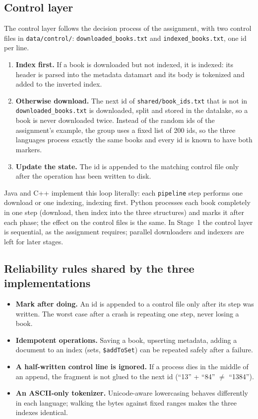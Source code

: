 \documentclass[11pt,a4paper]{article}
\newcommand{\code}[1]{\texttt{#1}}
\begin{document}
\subsection{Control layer}\label{sec:control}
The control layer follows the decision process of the assignment, with two control files in
\code{data/control/}: \code{downloaded\_books.txt} and \code{indexed\_books.txt}, one id per line.
\begin{enumerate}
  \item \textbf{Index first.} If a book is downloaded but not indexed, it is indexed: its header is
        parsed into the metadata datamart and its body is tokenized and added to the inverted index.
  \item \textbf{Otherwise download.} The next id of \code{shared/book\_ids.txt} that is not in
        \code{downloaded\_books.txt} is downloaded, split and stored in the datalake, so a book is
        never downloaded twice. Instead of the random ids of the assignment's example, the group uses
        a fixed list of 200 ids, so the three languages process exactly the same books and every id
        is known to have both markers.
  \item \textbf{Update the state.} The id is appended to the matching control file only after the
        operation has been written to disk.
\end{enumerate}
Java and C++ implement this loop literally: each \code{pipeline} step performs one download or one
indexing, indexing first. Python processes each book completely in one step (download, then index
into the three structures) and marks it after each phase; the effect on the control files is the
same. In Stage~1 the control layer is sequential, as the assignment requires; parallel downloaders
and indexers are left for later stages.

\subsection{Reliability rules shared by the three implementations}
\begin{itemize}
  \item \textbf{Mark after doing.} An id is appended to a control file only after its step was
        written. The worst case after a crash is repeating one step, never losing a book.
  \item \textbf{Idempotent operations.} Saving a book, upserting metadata, adding a document to an
        index (sets, \code{\$addToSet}) can be repeated safely after a failure.
  \item \textbf{A half-written control line is ignored.} If a process dies in the middle of an
        append, the fragment is not glued to the next id (``13'' + ``84'' $\neq$ ``1384'').
  \item \textbf{An ASCII-only tokenizer.} Unicode-aware lowercasing behaves differently in each
        language; walking the bytes against fixed ranges makes the three indexes identical.
\end{itemize}
\end{document}
